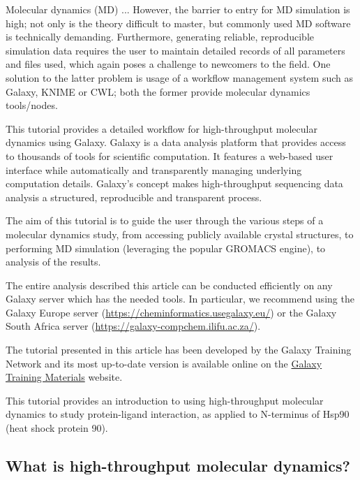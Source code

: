 \documentclass[twocolumn]{bmcart}%
\begin{document}
Molecular dynamics (MD) ... However, the barrier to entry for MD simulation is high; not only is the theory difficult to master, but commonly used MD software is technically demanding. Furthermore, generating reliable, reproducible simulation data requires the user to maintain detailed records of all parameters and files used, which again poses a challenge to newcomers to the field. One solution to the latter problem is usage of a workflow management system such as Galaxy, KNIME or CWL; both the former provide molecular dynamics tools/nodes.

This tutorial provides a detailed workflow for high-throughput molecular dynamics using Galaxy. Galaxy
\cite{afgan2018galaxy} is a data analysis platform that provides access to thousands of tools for scientific computation. It features a web-based user interface while automatically and transparently managing underlying computation details. Galaxy's
concept makes high-throughput sequencing data analysis a structured, reproducible and transparent process.

The aim of this tutorial is to guide the user through the various steps of a molecular dynamics study, from accessing publicly available crystal structures, to performing MD simulation (leveraging the popular GROMACS engine), to analysis of the results.

The entire analysis described this article can be conducted efficiently on any Galaxy server which has the needed tools. In particular, we recommend using the Galaxy Europe server
(\url{https://cheminformatics.usegalaxy.eu/}) or the Galaxy South Africa server (\url{https://galaxy-compchem.ilifu.ac.za/}).

The tutorial presented in this article has been developed by the Galaxy Training Network \cite{batut2018community} and its most up-to-date
version is available online on the \href{https://training.galaxyproject.org/topics/computational-chemistry/tutorials/htmd-analysis/tutorial.html}{Galaxy Training Materials} website.

This tutorial provides an introduction to using high-throughput
molecular dynamics to study protein-ligand interaction, as applied to
N-terminus of Hsp90 (heat shock protein 90).

\subsection*{What is high-throughput molecular
dynamics?}\label{what-is-high-throughput-molecular-dynamics}
\end{document}
